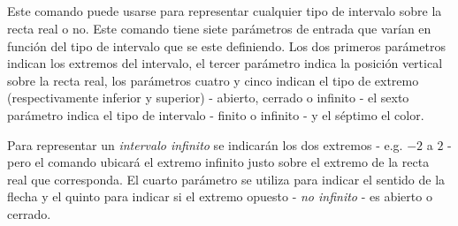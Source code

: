 \documentclass[10pt,a4paper]{article}
\begin{document}
\begin{tikzPlusCode}
\end{tikzPlusCode}

\subsection{} Este comando puede usarse para representar cualquier tipo de intervalo sobre la recta real o no. Este comando tiene siete parámetros de entrada que varían en función del tipo de intervalo que se este definiendo. Los dos primeros parámetros indican los extremos del intervalo, el tercer parámetro indica la posición vertical sobre la recta real, los parámetros cuatro y cinco indican el tipo de extremo (respectivamente inferior y superior) - abierto, cerrado o infinito - el sexto parámetro indica el tipo de intervalo - finito o infinito - y el séptimo el color.

\begin{tikzPlusCode}
\end{tikzPlusCode}

\begin{tikzPlusCode}
\end{tikzPlusCode}

\begin{tikzPlusCode}
\end{tikzPlusCode}

Para representar un \emph{intervalo infinito} se indicarán los dos extremos - e.g. $-2$ a $2$ - pero el comando ubicará el extremo infinito justo sobre el extremo de la recta real que corresponda. El cuarto parámetro se utiliza para indicar el sentido de la flecha y el quinto para indicar si el extremo opuesto - \textit{no infinito} - es abierto o cerrado.
\begin{tikzPlusCode}
\end{tikzPlusCode}
\end{document}
